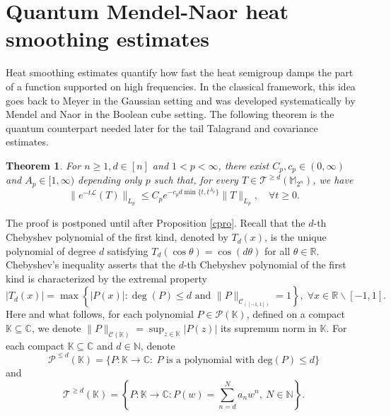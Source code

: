 \documentclass{amsbook}
\newtheorem{theorem}{Theorem}[chapter]
\theoremstyle{definition}
\theoremstyle{remark}
\numberwithin{section}{chapter}
\numberwithin{equation}{chapter}
\newcommand{\1}{\mathbf{1}}
\begin{document}
\section{Quantum Mendel-Naor heat smoothing estimates}

Heat smoothing estimates quantify how fast the heat semigroup damps the part of a function supported on high frequencies.  In the classical framework, this idea goes back to Meyer \cite{Me1984} in the Gaussian setting and was developed systematically by Mendel and Naor \cite{MN2014} in the Boolean cube setting.  The following theorem is the quantum counterpart needed later for the tail Talagrand and covariance estimates.

\begin{theorem}\label{mn-k-tail}
For $n\geq1, d \in [n]$ and $1<p<\infty$, there exist $C_p,c _p\in(0,\infty)$ and $A_p\in[1,\infty)$  depending only $p$ such that, for every  $T\in\mathcal{T}^{\geq d}(\mathbb{M}_{2^n})$,  we have
\begin{equation}\label{mn-k-tail-ineq}
\big\|e^{-t \mathcal{L}}(T)\big\|_{L_{p}} \leq C_p e^{-c_p d \min \{t, t^{A_p}\}}\|T\|_{L_{p}},\quad \forall t \geq 0.
\end{equation}
\end{theorem}

The proof is postponed until after Proposition \ref{cpro}. Recall that the $d$-th Chebyshev polynomial of the first kind, denoted by $T_{d}(x)$, is the unique polynomial of degree $d$ satisfying $T_{d}(\cos \theta)=\cos (d \theta)$ for all $\theta \in \mathbb{R}$. Chebyshev's inequality \cite[p.235]{BE1995} asserts that the $d$-th Chebyshev polynomial of the first kind is characterized by the extremal property
\begin{equation}\label{cp}
\left|T_{d}(x)\right|=\max \left\{|P(x)|: \operatorname{deg}(P) \leq d \text { and }\|P\|_{\mathcal{C}_{([-1,1])}}=1\right\},\; \forall x \in \mathbb{R} \backslash[-1,1].
\end{equation}
Here and what follows, for each polynomial $P\in \mathcal{P}(\mathbb{K})$, defined on a compact $\mathbb{K}\subseteq \mathbb{C}$, we denote $\|P\|_{\mathcal{C}(\mathbb{K})}=\sup_{z\in \mathbb{K}} |P(z)|$ its  supremum
norm in $\mathbb{K}$.
For each compact $\mathbb{K}\subseteq \mathbb{C}$ and $d\in \mathbb{N}$, denote 
$$\mathcal{P}^{\leq d}(\mathbb{K})=\{P:\mathbb{K}\rightarrow\mathbb{C}: \  \mbox{$P$ is a polynomial with $\mathrm{deg}(P)\leq d$}\}$$ 
and
\[
\mathcal{T}^{\geq d}(\mathbb{K})=\left\{P:\mathbb{K}\rightarrow\mathbb{C}: P(w)=\sum_{n=d}^{N}a_{n}w^{n},~N\in \mathbb{N}\right\}.
\] 
\end{document}
